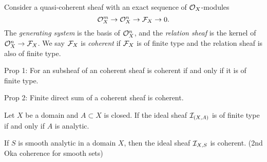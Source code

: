 \documentclass{../../large}
\begin{document}
\begin{prb}
Consider a quasi-coherent sheaf with an exact sequence of $\mathcal{O}_X$-modules
\[\mathcal{O}_X^m\to\mathcal{O}_X^n\to\mathcal{F}_X\to0.\]
The \emph{generating system} is the basis of $\mathcal{O}_X^n$, and the \emph{relation sheaf} is the kernel of $\mathcal{O}_X^n\to\mathcal{F}_X$.
We say $\mathcal{F}_X$ is \emph{coherent} if $\mathcal{F}_X$ is of finite type and the relation sheaf is also of finite type.
\end{prb}


Prop 1: For an subsheaf of an coherent sheaf is coherent if and only if it is of finite type.

Prop 2: Finite direct sum of a coherent sheaf is coherent.


\begin{thm*}[2.2.12]
Let $X$ be a domain and $A\subset X$ is closed.
If the ideal sheaf $\mathcal{I}_{(X,A)}$ is of finite type if and only if $A$ is analytic.
\end{thm*}
\begin{thm*}[2.2.17]
If $S$ is smooth analytic in a domain $X$, then the ideal sheaf $\mathcal{I}_{X,S}$ is coherent. (2nd Oka coherence for smooth sets)
\end{thm*}
\end{document}
